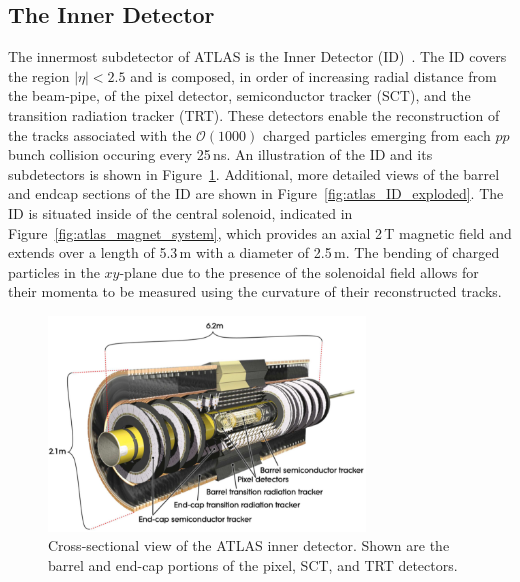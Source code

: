 \subsection{The Inner Detector}
\label{sec:inner_detector}

The innermost subdetector of ATLAS is the Inner Detector (ID)~\cite{Haywood:331064}.
The ID covers the region $\lvert \eta \rvert < 2.5$ and is composed, in order
of increasing radial distance from the beam-pipe, of the pixel detector,
semiconductor tracker (SCT), and the transition radiation tracker (TRT).
These detectors enable the reconstruction of the tracks associated with
the $\mathcal{O}(1000)$ charged particles emerging from each $pp$ bunch collision occuring
every 25\,ns.
An illustration of the ID and its subdetectors is shown in Figure~\ref{fig:atlas_inner_detector}.
Additional, more detailed views of the barrel and endcap sections of the ID are shown in Figure~\ref{fig:atlas_ID_exploded}.
The ID is situated inside of the central solenoid, indicated in Figure~\ref{fig:atlas_magnet_system},
which provides an axial 2\,T magnetic field and extends over a length of 5.3\,m with a diameter of 2.5\,m.
The bending of charged particles in the $xy$-plane due to the presence of the solenoidal
field allows for their momenta to be measured using the curvature of their reconstructed tracks.

\begin{figure}[!htb]
    \begin{center}
        \includegraphics[width=0.75\textwidth]{figures/chapter2/atlas_inner_detector}
        \caption{
            Cross-sectional view of the ATLAS inner detector. Shown are the barrel
            and end-cap portions of the pixel, SCT, and TRT detectors.
        }
        \label{fig:atlas_inner_detector}
    \end{center}
\end{figure}

